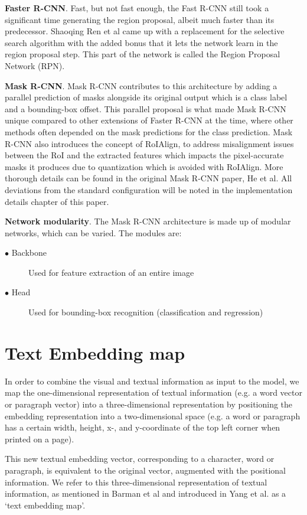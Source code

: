 \documentclass[english, bibtex]{kththesis}
\begin{document}
\textbf{Faster R-CNN}. Fast, but not fast enough, the Fast R-CNN still took a significant time generating the region proposal, albeit much faster than its predecessor. Shaoqing Ren et al\cite{7485869} came up with a replacement for the selective search algorithm with the added bonus that it lets the network learn in the region proposal step. This part of the network is called the Region Proposal Network (RPN). 

\textbf{Mask R-CNN}. Mask R-CNN contributes to this architecture by adding a parallel prediction of masks alongside its original output which is a class label and a bounding-box offset. This parallel proposal is what made Mask R-CNN unique compared to other extensions of Faster R-CNN at the time, where other methods often depended on the mask predictions for the class prediction. Mask R-CNN also introduces the concept of RoIAlign, to address misalignment issues between the RoI and the extracted features which impacts the pixel-accurate masks it produces due to quantization which is avoided with RoIAlign. More thorough details can be found in the original Mask R-CNN paper, He et al\cite{DBLP:journals/corr/HeGDG17}. All deviations from the standard configuration will be noted in the implementation details chapter of this paper.

\textbf{Network modularity}. The Mask R-CNN architecture is made up of modular networks, which can be varied. The modules are:

\begin{description}
\item[$\bullet$ Backbone] Used for feature extraction of an entire image
\item[$\bullet$ Head] Used for bounding-box recognition (classification and regression)
\end{description}

\section{Text Embedding map}

In order to combine the visual and textual information as input to the model, we map the one-dimensional representation of textual information (e.g. a word vector or paragraph vector) into a three-dimensional representation by positioning the embedding representation into a two-dimensional space (e.g. a word or paragraph has a certain width, height, x-, and y-coordinate of the top left corner when printed on a page). 

This new textual embedding vector, corresponding to a character, word or paragraph, is equivalent to the original vector, augmented with the positional information. We refer to this three-dimensional representation of textual information, as mentioned in Barman et al\cite{jdmdh:7097} and introduced in Yang et al.\cite{DBLP:journals/corr/YangYAKKG17} as a ‘text embedding map’.
\end{document}

